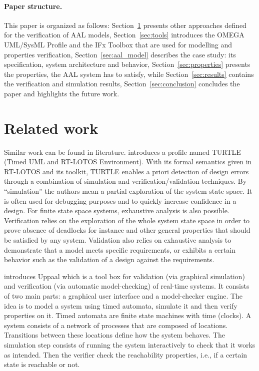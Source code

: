 \documentclass[a4paper,twoside]{article}
\begin{document}
\paragraph*{Paper structure.} This paper is organized as follows: Section~\ref{sec:r_work} presents other approaches defined for the verification of AAL models, Section~\ref{sec:tools} introduces the OMEGA UML/SysML Profile and the IFx Toolbox that are used for modelling and properties verification, Section~\ref{sec:aal_model} describes the case study: its specification, system architecture and behavior, Section~\ref{sec:properties} presents the properties, the AAL system has to satisfy, while Section~\ref{sec:results} contains the verification and simulation results, Section~\ref{sec:conclusion} concludes the paper and highlights the future work.

\section{Related work}
\label{sec:r_work}

Similar work can be found in literature. \cite{test9} introduces a profile named TURTLE (Timed UML and RT-LOTOS Environment). With its formal semantics given in RT-LOTOS and its toolkit, TURTLE enables a priori detection of design errors through a combination of simulation and verification/validation techniques. By “simulation” the authors mean a partial exploration of the system state space. It is often used for debugging purposes and to quickly increase confidence in a design. For finite state space systems, exhaustive analysis is also possible. Verification relies 
on the exploration of the whole system state space in order to prove absence of deadlocks for instance and other general properties that should be satisfied by any system. Validation also relies on exhaustive analysis to demonstrate that a model meets specific requirements, or exhibits a certain behavior  such as the validation of a design against the requirements.

\cite{test10} introduces Uppaal which is a tool box for validation (via graphical simulation) and verification (via automatic model-checking) of real-time systems. It consists of two main parts: a graphical user interface and a model-checker engine. The idea is to model a system using timed automata, simulate it and then verify properties on it. Timed automata are finite state machines with time (clocks). A system consists of a network of processes that are composed of locations. Transitions between these locations define how the system behaves. The simulation step consists of running the system interactively to check that it works as intended. Then the verifier check the reachability properties, i.e., if a certain state is reachable or not. 
\end{document}
